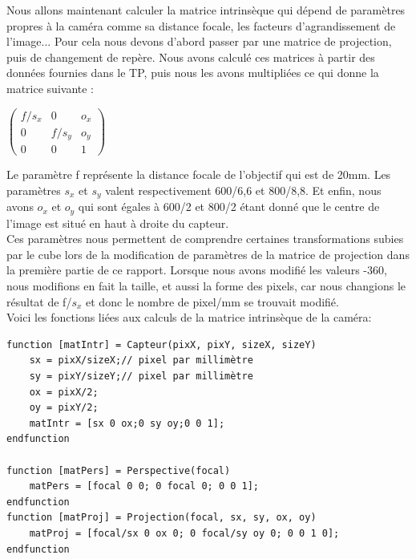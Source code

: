 \documentclass[a4paper,11pt]{article}
\begin{document}
  Nous allons maintenant calculer la matrice intrinsèque qui dépend de paramètres propres à la caméra comme sa 
  distance focale, les facteurs d'agrandissement de l'image... Pour cela nous devons d'abord passer par une matrice 
  de projection, puis de changement de repère. Nous avons calculé ces matrices à partir des données fournies dans le TP,
  puis nous les avons multipliées ce qui donne la matrice suivante :
  
  \begin{center}
   $\begin{pmatrix}
     f/s_x & 0 & o_x\\  
     0 & f/s_y & o_y\\  
     0 & 0 & 1 
     \end{pmatrix}$\\
  \end{center}
     
  Le paramètre f représente la distance focale de l'objectif qui est de 20mm. Les paramètres $s_x$ et $s_y$
  valent respectivement 600/6,6 et 800/8,8. Et enfin, nous avons $o_x$ et $o_y$ qui sont égales à 
  600/2 et 800/2 étant donné que le centre de l'image est situé en haut à droite du capteur.\\
     
  Ces paramètres nous permettent de comprendre certaines transformations subies par le cube lors
  de la modification de paramètres de la matrice de projection dans la première partie de ce rapport.
  Lorsque nous avons modifié les valeurs -360, nous modifions en fait la taille, et aussi la forme
  des pixels, car nous changions le résultat de f/$s_x$ et donc le nombre de pixel/mm se trouvait modifié.\\
  
  Voici les fonctions liées aux calculs de la matrice intrinsèque de la caméra:
  \begin{lstlisting}[caption=Fonctions propres aux calculs de la matrice intrinsèque]
function [matIntr] = Capteur(pixX, pixY, sizeX, sizeY)
    sx = pixX/sizeX;// pixel par millimètre
    sy = pixY/sizeY;// pixel par millimètre
    ox = pixX/2;
    oy = pixY/2;
    matIntr = [sx 0 ox;0 sy oy;0 0 1];
endfunction

function [matPers] = Perspective(focal)
    matPers = [focal 0 0; 0 focal 0; 0 0 1];
endfunction
function [matProj] = Projection(focal, sx, sy, ox, oy)
    matProj = [focal/sx 0 ox 0; 0 focal/sy oy 0; 0 0 1 0];
endfunction\end{lstlisting}
  
\end{document}

